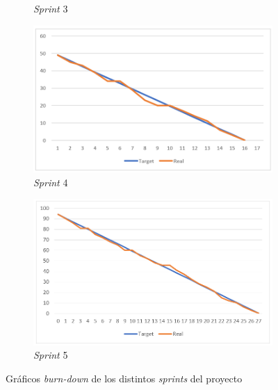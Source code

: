 \begin{figure}[hbtp]
\begin{subfigure}{.5\textwidth}
    \caption{\textit{Sprint} 3}
    \label{fig:sprint3}
\end{subfigure}
\begin{subfigure}{.5\textwidth}
    \includegraphics[width=\linewidth]{figuras/sprint4.png}
    \caption{\textit{Sprint} 4}
    \label{fig:sprint4}
\end{subfigure}
\begin{subfigure}{\textwidth}
    \centering
    \includegraphics[width=.5\linewidth]{figuras/sprint5.png}
    \caption{\textit{Sprint} 5}
    \label{fig:sprint5}
\end{subfigure}
\caption{Gráficos \textit{burn-down} de los distintos \textit{sprints} del proyecto}
\label{fig:sprints}
\end{figure}

